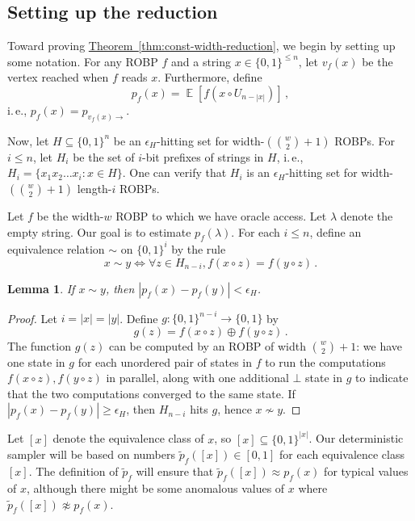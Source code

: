 \documentclass[11pt]{article}
\numberwithin{equation}{section}
\newtheorem{lemma}[theorem]{Lemma}
\theoremstyle{definition}
\theoremstyle{plain}
\newcommand{\ie}{i.\,e.}
\newcommand{\expref}[2]{\hyperref[#2]{#1~\ref{#2}}}
\DeclareMathOperator*{\ExpVal}{\mathbb{E}}
\begin{document}
\subsection{Setting up the reduction}
Toward proving \expref{Theorem}{thm:const-width-reduction}, we begin by setting up some notation. For any ROBP $f$ and a string $x \in \{0, 1\}^{\leq n}$, let $v_f(x)$ be the vertex reached when $f$ reads $x$. Furthermore, define
$$
p_f(x) = \ExpVal[f(x \circ U_{n - |x|})]\,,
$$
\ie, $p_f(x) = p_{v_f(x) \to}$.

Now, let $H \subseteq \{0, 1\}^n$ be an $\epsilon_H$-hitting set for width-$(\binom{w}{2} + 1)$ ROBPs. For $i \leq n$, let $H_i$ be the set of $i$-bit prefixes of strings in $H$, \ie, $H_i = \{x_1 x_2 \dots x_i : x \in H\}$. One can verify that $H_i$ is an $\epsilon_H$-hitting set for width-$(\binom{w}{2} + 1)$ length-$i$ ROBPs.

Let $f$ be the width-$w$ ROBP to which we have oracle access. Let $\lambda$ denote the empty string. Our goal is to estimate $p_f(\lambda)$. For each $i \leq n$, define an equivalence relation $\sim$ on $\{0, 1\}^i$ by the rule
$$
x \sim y \iff \forall z \in H_{n - i}, f(x \circ z) = f(y \circ z)\,.
$$
\begin{lemma} \label{lem:equiv}
If $x \sim y$, then $|p_f(x) - p_f(y)| < \epsilon_H$.
\end{lemma}

\begin{proof}
Let $i = |x| = |y|$. Define $g \colon \{0, 1\}^{n - i} \to \{0, 1\}$ by
$$
g(z) = f(x \circ z) \oplus f(y \circ z)\,.
$$
The function $g(z)$ can be computed by an ROBP of width $\binom{w}{2} + 1$: we have one state in $g$ for each unordered pair of states in $f$ to run the computations $f(x \circ z), f(y \circ z)$ in parallel, along with one additional $\bot$ state in $g$ to indicate that the two computations converged to the same state. If $|p_f(x) - p_f(y)| \geq \epsilon_H$, then $H_{n - i}$ hits $g$, hence $x \not \sim y$.
\end{proof}

Let $[x]$ denote the equivalence class of $x$, so $[x] \subseteq \{0, 1\}^{|x|}$. Our deterministic sampler will be based on numbers $\widetilde{p}_f([x]) \in [0, 1]$ for each equivalence class $[x]$. The definition of $\widetilde{p}_f$ will ensure that $\widetilde{p}_f([x]) \approx p_f(x)$ for typical values of $x$, although there might be some anomalous values of $x$ where $\widetilde{p}_f([x]) \not \approx p_f(x)$.
\end{document}
